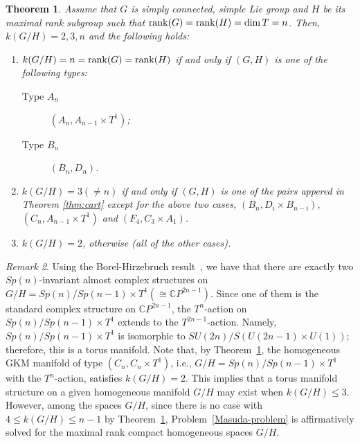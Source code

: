 \documentclass{amsart}
\newtheorem{theorem}{Theorem}[section]
\theoremstyle{definition}
\theoremstyle{remark}
\newtheorem{remark}[theorem]{Remark}
\numberwithin{equation}{section}
\begin{document}
\begin{theorem}
\label{main}
Assume that $G$ is simply connected, simple Lie group and $H$ be its maximal rank 
subgroup such that ${\rm rank}(G)={\rm rank}(H)=\dim T=n$.
Then, $k(G/H)=2,3,n$ and the following holds:
\begin{enumerate}
\item $k(G/H)=n={\rm rank}(G)={\rm rank}(H)$ if and only if $(G,H)$ is one of the following types:
\begin{description}
\item[Type $A_{n}$] $(A_{n},A_{n-1}\times T^{1})$;
\item[Type $B_{n}$] $(B_{n}, D_{n})$.
\end{description}
\item $k(G/H)=3(\not=n)$ if and only if 
$(G,H)$ is one of the pairs appered in Theorem \ref{thm:cart} except for the above two cases, $(B_{n},D_{i}\times B_{n-i})$, $(C_{n},A_{n-1}\times T^{1})$ and $(F_{4}, C_{3}\times A_{1})$.
\item $k(G/H)=2$, otherwise (all of the other cases). 
\end{enumerate}
\end{theorem}

\begin{remark}
\label{about_torus_mainfold1}
Using the Borel-Hirzebruch result~\cite{BoHi}, we have that there are exactly two $Sp(n)$-invariant almost complex structures on $G/H=Sp(n)/Sp(n-1)\times T^{1} (\cong \mathbb{C}P^{2n-1})$.
Since one of them is the standard complex structure on $\mathbb{C}P^{2n-1}$, the $T^{n}$-action on $Sp(n)/Sp(n-1)\times T^{1}$ extends to the $T^{2n-1}$-action.
Namely, $Sp(n)/Sp(n-1)\times T^{1}$ is isomorphic to $SU(2n)/S(U(2n-1)\times U(1))$; therefore, this is a torus manifold.
Note that, by Theorem~\ref{main}, the homogeneous GKM manifold of type $(C_{n},C_{n}\times T^{1})$, i.e., $G/H=Sp(n)/Sp(n-1)\times T^{1}$ with the $T^{n}$-action, satisfies $k(G/H)=2$.
This implies that a torus manifold structure on a given homogeneous manifold $G/H$ may exist when $k(G/H)\le 3$.
However, among the spaces $G/H$, since there is no case with $4\le k(G/H)\le n-1$ by Theorem~\ref{main}, Problem~\ref{Masuda-problem} is affirmatively solved for the maximal rank compact homogeneous spaces $G/H$.
\end{remark}
\end{document}
